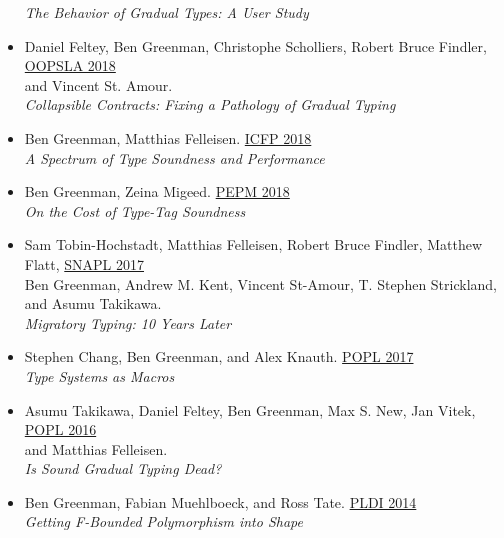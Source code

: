 \documentclass[11pt]{article}
\begin{document}
\begin{itemize}
  \emph{The Behavior of Gradual Types: A User Study} \hfill {}
\item
  Daniel Feltey, Ben Greenman, Christophe Scholliers, Robert Bruce Findler, \hfill \href{https://2018.splashcon.org/track/splash-2018-OOPSLA}{OOPSLA 2018} \\
  and Vincent St. Amour. \\
  \emph{Collapsible Contracts: Fixing a Pathology of Gradual Typing} \hfill {}
\item
  Ben Greenman, Matthias Felleisen. \hfill \href{https://icfp18.sigplan.org/}{ICFP 2018} \\
  \emph{A Spectrum of Type Soundness and Performance} \hfill {}
\item
  Ben Greenman, Zeina Migeed. \hfill \href{https://popl18.sigplan.org/track/PEPM-2018}{PEPM 2018} \\
  \emph{On the Cost of Type-Tag Soundness} \hfill {} %
\item
  Sam Tobin-Hochstadt, Matthias Felleisen, Robert Bruce Findler, Matthew Flatt, \hfill \href{https://snapl.org/2017/}{SNAPL 2017} \\
  Ben Greenman, Andrew M. Kent, Vincent St-Amour, T. Stephen Strickland, \\
  and Asumu Takikawa. \\
  \emph{Migratory Typing: 10 Years Later} \hfill {}
\item
  Stephen Chang, Ben Greenman, and Alex Knauth. \hfill \href{https://popl17.sigplan.org/}{POPL 2017} \\
   \emph{Type Systems as Macros} \hfill {}
\item
  Asumu Takikawa, Daniel Feltey, Ben Greenman, Max S. New, Jan Vitek, \hfill \href{https://popl16.sigplan.org/}{POPL 2016} \\
   and Matthias Felleisen. \\
   \emph{Is Sound Gradual Typing Dead?} \hfill {} %
\item
  Ben Greenman, Fabian Muehlboeck, and Ross Tate. \hfill \href{https://conferences.inf.ed.ac.uk/pldi2014/}{PLDI 2014} \\
  \emph{Getting F-Bounded Polymorphism into Shape} \hfill {}
\end{itemize}
\end{document}
